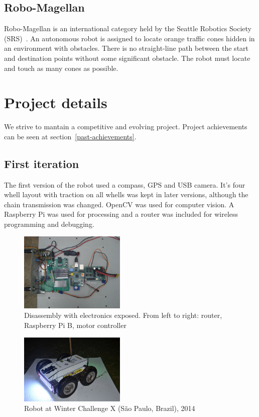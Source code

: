\documentclass[conference]{IEEEtran}
\begin{document}
\subsection{Robo-Magellan}
Robo-Magellan is an international category held by the Seattle Robotics Society
(SRS)~\cite{SRS}. An autonomous robot is assigned to locate orange traffic cones
hidden in an environment with obstacles. There is no straight-line path between
the start and destination points without some significant obstacle. The robot
must locate and touch as many cones as possible.

\section{Project details}
\setcounter{subsection}{0}
We strive to mantain a competitive and evolving project. Project achievements
can be seen at section~\ref{past-achievements}.
\subsection{First iteration}
The first version of the robot used a compass, GPS and USB camera. It's four
whell layout with traction on all whells was kept in later versions, although
the chain transmission was changed. OpenCV was used for computer vision. A
Raspberry Pi was used for processing and a router was included for wireless
programming and debugging.

\begin{figure}[H]
    \centering
    \includegraphics[width=0.45\textwidth]{../Pictures/v1/WCX2014/DSC01671.JPG}
    \caption{Disassembly with electronics exposed. From left to right: router,
    Raspberry Pi B, motor controller}
\end{figure}

\begin{figure}[H]
    \centering
    \includegraphics[width=0.45\textwidth]{../Pictures/v1/WCX2014/14749170673_6e4bfca9fc_z.jpg}
    \caption{Robot at Winter Challenge X (São Paulo, Brazil), 2014}
\end{figure}
\end{document}
